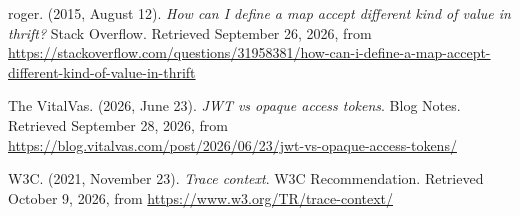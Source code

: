 \hangindent=1.27cm  roger. (2015, August 12). \textit{How can I define a map accept different kind of value in thrift?} Stack Overflow. Retrieved September 26, 2026, from \url{https://stackoverflow.com/questions/31958381/how-can-i-define-a-map-accept-different-kind-of-value-in-thrift}

\hangindent=1.27cm  The VitalVas. (2026, June 23). \textit{JWT vs opaque access tokens}. Blog Notes. Retrieved September 28, 2026, from \url{https://blog.vitalvas.com/post/2026/06/23/jwt-vs-opaque-access-tokens/}

\hangindent=1.27cm  W3C. (2021, November 23). \textit{Trace context}. W3C Recommendation. Retrieved October 9, 2026, from \url{https://www.w3.org/TR/trace-context/}
